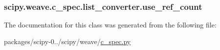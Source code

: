\subsubsection[{use\+\_\+ref\+\_\+count}]{\setlength{\rightskip}{0pt plus 5cm}scipy.\+weave.\+c\+\_\+spec.\+list\+\_\+converter.\+use\+\_\+ref\+\_\+count}\label{classscipy_1_1weave_1_1c__spec_1_1list__converter_a7a1241ca2064d71d8f4f7586406d6ccc}


The documentation for this class was generated from the following file\+:\begin{DoxyCompactItemize}
\item 
packages/scipy-\/0../scipy/weave/\hyperlink{c__spec_8py}{c\+\_\+spec.\+py}\end{DoxyCompactItemize}
